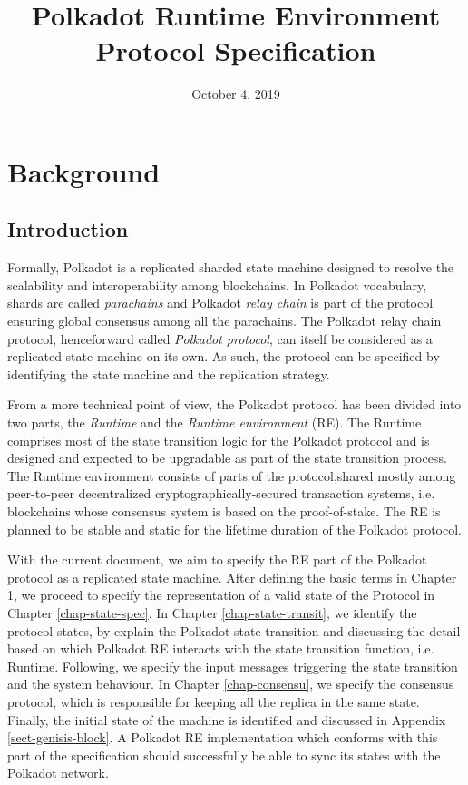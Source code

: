 \documentclass{book}
\newcommand{\tmem}[1]{{\em #1\/}}
\begin{document}
\title{
  Polkadot Runtime Environment\\
  {\Large Protocol Specification}
}

\date{October 4, 2019}

\maketitle

{\tableofcontents}

\chapter{Background}

\section{Introduction}

Formally, Polkadot is a replicated sharded state machine designed to resolve
the scalability and interoperability among blockchains. In Polkadot
vocabulary, shards are called {\tmem{parachains}} and Polkadot {\tmem{relay
chain}} is part of the protocol ensuring global consensus among all the
parachains. The Polkadot relay chain protocol, henceforward called
{\tmem{Polkadot protocol}}, can itself be considered as a replicated state
machine on its own. As such, the protocol can be specified by identifying the
state machine and the replication strategy.

From a more technical point of view, the Polkadot protocol has been divided
into two parts, the {\tmem{Runtime}} and the {\tmem{Runtime environment}}
(RE). The Runtime comprises most of the state transition logic for the
Polkadot protocol and is designed and expected to be upgradable as part of the
state transition process. The Runtime environment consists of parts of the
protocol,\quad shared mostly among peer-to-peer decentralized
cryptographically-secured transaction systems, i.e. blockchains whose
consensus system is based on the proof-of-stake. The RE is planned to be
stable and static for the lifetime duration of the Polkadot protocol.

With the current document, we aim to specify the RE part of the Polkadot
protocol as a replicated state machine. After defining the basic terms in
Chapter 1, we proceed to specify the representation of a valid state of the
Protocol in Chapter \ref{chap-state-spec}. In Chapter
\ref{chap-state-transit}, we identify the protocol states, by explain the
Polkadot state transition and discussing the detail based on which Polkadot RE
interacts with the state transition function, i.e. Runtime. Following, we
specify the input messages triggering the state transition and the system
behaviour. In Chapter \ref{chap-consensu}, we specify the consensus protocol,
which is responsible for keeping all the replica in the same state. Finally,
the initial state of the machine is identified and discussed in Appendix
\ref{sect-genisis-block}. A Polkadot RE implementation which conforms with
this part of the specification should successfully be able to sync its states
with the Polkadot network.
\end{document}
